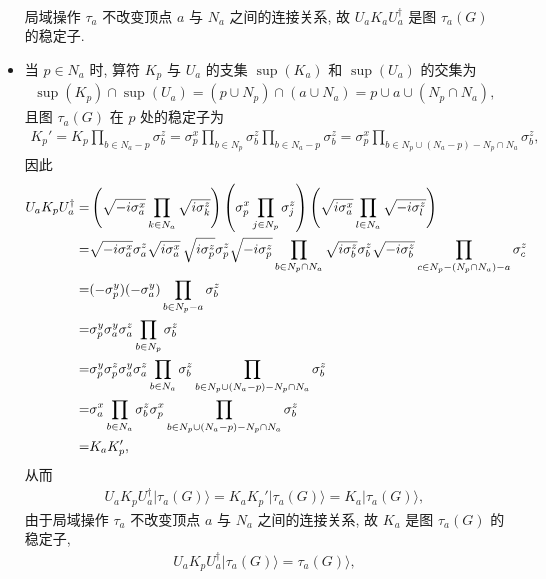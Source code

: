 \documentclass{assignment}
\begin{document}
\begin{pf}
\begin{itemize}
\begin{align}
        \end{align}
        局域操作 $\tau_a$ 不改变顶点 $a$ 与 $N_a$ 之间的连接关系, 故 $U_aK_aU_a^{\dagger}$ 是图 $\tau_a(G)$ 的稳定子.
        \item 当 $p\in N_a$ 时, 算符 $K_p$ 与 $U_a$ 的支集 $\sup(K_a)$ 和 $\sup(U_a)$ 的交集为
        \begin{align}
            \sup(K_p)\cap\sup(U_a)=(p\cup N_p)\cap(a\cup N_a)=p\cup a\cup(N_p\cap N_a),
        \end{align}
        且图 $\tau_a(G)$ 在 $p$ 处的稳定子为
        \begin{align}
            K_p'=K_p\prod_{b\in N_a-p}\sigma_b^z=\sigma_p^x\prod_{b\in N_p}\sigma_b^z\prod_{b\in N_a-p}\sigma_b^z=\sigma_p^x\prod_{b\in N_p\cup(N_a-p)-N_p\cap N_a}\sigma_b^z,
        \end{align}
        因此
        \begin{align}
            \notag U_aK_pU_a^{\dagger}=&\left(\sqrt{-i\sigma_a^x}\prod_{k\in N_a}\sqrt{i\sigma_k^z}\right)\left(\sigma_p^x\prod_{j\in N_p}\sigma_j^z\right)\left(\sqrt{i\sigma_a^x}\prod_{l\in N_a}\sqrt{-i\sigma_l^z}\right)\\
            \notag=&\sqrt{-i\sigma_a^x}\sigma_a^z\sqrt{i\sigma_a^x}\,\sqrt{i\sigma_p^z}\sigma_p^z\sqrt{-i\sigma_p^z}\prod_{b\in N_p\cap N_a}\sqrt{i\sigma_b^z}\sigma_b^z\sqrt{-i\sigma_b^z}\prod_{c\in N_p-(N_p\cap N_a)-a}\sigma_c^z\\
            \notag=&(-\sigma_p^y)(-\sigma_a^y)\prod_{b\in N_p-a}\sigma_b^z\\
            \notag=&\sigma_p^y\sigma_a^y\sigma_a^z\prod_{b\in N_p}\sigma_b^z\\
            \notag=&\sigma_p^y\sigma_p^z\sigma_a^y\sigma_a^z\prod_{b\in N_a}\sigma_b^z\prod_{b\in N_p\cup(N_a-p)-N_p\cap N_a}\sigma_b^z\\
            \notag=&\sigma_a^x\prod_{b\in N_a}\sigma_b^z\sigma_p^x\prod_{b\in N_p\cup(N_a-p)-N_p\cap N_a}\sigma_b^z\\
            \notag=&K_aK_p',
        \end{align}
        从而
        \begin{align}
            U_aK_pU_a^{\dagger}\lvert\tau_a(G)\rangle=K_aK_p'\lvert\tau_a(G)\rangle=K_a\lvert\tau_a(G)\rangle,
        \end{align}
        由于局域操作 $\tau_a$ 不改变顶点 $a$ 与 $N_a$ 之间的连接关系, 故 $K_a$ 是图 $\tau_a(G)$ 的稳定子,
        \begin{align}
            U_aK_pU_a^{\dagger}\lvert\tau_a(G)\rangle=\tau_a(G)\rangle,

\end{align}
\end{itemize}
\end{pf}
\end{document}
